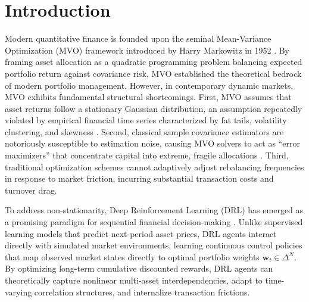 \documentclass[conference]{IEEEtran}
\begin{document}
\section{Introduction}
Modern quantitative finance is founded upon the seminal Mean-Variance Optimization (MVO) framework introduced by Harry Markowitz in 1952 \cite{markowitz1952portfolio}. By framing asset allocation as a quadratic programming problem balancing expected portfolio return against covariance risk, MVO established the theoretical bedrock of modern portfolio management. However, in contemporary dynamic markets, MVO exhibits fundamental structural shortcomings. First, MVO assumes that asset returns follow a stationary Gaussian distribution, an assumption repeatedly violated by empirical financial time series characterized by fat tails, volatility clustering, and skewness \cite{mandelbrot1963variation, cont2001empirical}. Second, classical sample covariance estimators are notoriously susceptible to estimation noise, causing MVO solvers to act as ``error maximizers'' that concentrate capital into extreme, fragile allocations \cite{michaud1989markowitz}. Third, traditional optimization schemes cannot adaptively adjust rebalancing frequencies in response to market friction, incurring substantial transaction costs and turnover drag.

To address non-stationarity, Deep Reinforcement Learning (DRL) has emerged as a promising paradigm for sequential financial decision-making \cite{jiang2017deep, liang2018adversarial}. Unlike supervised learning models that predict next-period asset prices, DRL agents interact directly with simulated market environments, learning continuous control policies that map observed market states directly to optimal portfolio weights $\mathbf{w}_t \in \Delta^N$. By optimizing long-term cumulative discounted rewards, DRL agents can theoretically capture nonlinear multi-asset interdependencies, adapt to time-varying correlation structures, and internalize transaction frictions.
\end{document}
